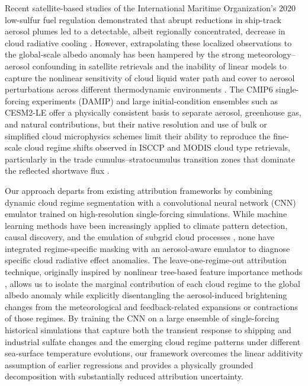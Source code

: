 \documentclass{article}
\begin{document}
Recent satellite-based studies of the International Maritime Organization's 2020 low-sulfur fuel regulation demonstrated that abrupt reductions in ship-track aerosol plumes led to a detectable, albeit regionally concentrated, decrease in cloud radiative cooling \cite{Diamond2020_ship_tracks,Yuan2023_IMO2020,Gryspeerdt2023_shipping_regulation}. However, extrapolating these localized observations to the global-scale albedo anomaly has been hampered by the strong meteorology–aerosol confounding in satellite retrievals and the inability of linear models to capture the nonlinear sensitivity of cloud liquid water path and cover to aerosol perturbations across different thermodynamic environments \cite{Quaas2009_satellite_cloud_aerosol,Stier2007_aerosol_coherence,Wang2012_aos_cloud_regime}. The CMIP6 single-forcing experiments (DAMIP) and large initial-condition ensembles such as CESM2-LE \cite{Rodgers2021_CESM2LE_singleforcing} offer a physically consistent basis to separate aerosol, greenhouse gas, and natural contributions, but their native resolution and use of bulk or simplified cloud microphysics schemes limit their ability to reproduce the fine-scale cloud regime shifts observed in ISCCP and MODIS cloud type retrievals, particularly in the trade cumulus–stratocumulus transition zones that dominate the reflected shortwave flux \cite{Eyring2021_CMIP6,Mauritsen2021_trade_cumulus_feedback,Klein2017_stratocumulus_regimes}.

Our approach departs from existing attribution frameworks by combining dynamic cloud regime segmentation with a convolutional neural network (CNN) emulator trained on high-resolution single-forcing simulations. While machine learning methods have been increasingly applied to climate pattern detection, causal discovery, and the emulation of subgrid cloud processes \cite{Barnes2019_neural_cloud_prediction,Chattopadhyay2020_deep_learning_climate,Rasp2021_cloud_emulator}, none have integrated regime-specific masking with an aerosol-aware emulator to diagnose specific cloud radiative effect anomalies. The leave-one-regime-out attribution technique, originally inspired by nonlinear tree-based feature importance methods \cite{Runge2019_causal_climate,Lundberg2019_SHAP}, allows us to isolate the marginal contribution of each cloud regime to the global albedo anomaly while explicitly disentangling the aerosol-induced brightening changes from the meteorological and feedback-related expansions or contractions of those regimes. By training the CNN on a large ensemble of single-forcing historical simulations that capture both the transient response to shipping and industrial sulfate changes and the emerging cloud regime patterns under different sea-surface temperature evolutions, our framework overcomes the linear additivity assumption of earlier regressions and provides a physically grounded decomposition with substantially reduced attribution uncertainty.
\end{document}
